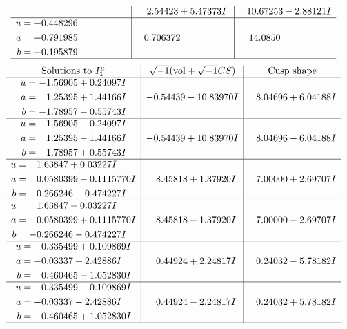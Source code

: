 \documentclass[1p]{elsarticle_modified}
\theoremstyle{definition}
\newcommand{\I}{\sqrt{-1}}
\begin{document}
$$\begin{array}{c|c|c}
 & \phantom{-}2.54423 + 5.47373 I & \phantom{-}10.67253 - 2.88121 I \\ \hline\begin{aligned}
u &= -0.448296\phantom{ +0.000000I} \\
a &= -0.791985\phantom{ +0.000000I} \\
b &= -0.195879\phantom{ +0.000000I}\end{aligned}
 & \phantom{-}0.706372\phantom{ +0.000000I} & \phantom{-}14.0850\phantom{ +0.000000I}\\
 \hline 
 \end{array}$$\newpage$$\begin{array}{c|c|c}  
\text{Solutions to }I^u_{1}& \I (\text{vol} + \sqrt{-1}CS) & \text{Cusp shape}\\
 \hline 
\begin{aligned}
u &= -1.56905 + 0.24097 I \\
a &= \phantom{-}1.25395 + 1.44166 I \\
b &= -1.78957 - 0.55743 I\end{aligned}
 & -0.54439 - 10.83970 I & \phantom{-}8.04696 + 6.04188 I \\ \hline\begin{aligned}
u &= -1.56905 - 0.24097 I \\
a &= \phantom{-}1.25395 - 1.44166 I \\
b &= -1.78957 + 0.55743 I\end{aligned}
 & -0.54439 + 10.83970 I & \phantom{-}8.04696 - 6.04188 I \\ \hline\begin{aligned}
u &= \phantom{-}1.63847 + 0.03227 I \\
a &= \phantom{-}0.0580399 - 0.1115770 I \\
b &= -0.266246 + 0.474227 I\end{aligned}
 & \phantom{-}8.45818 + 1.37920 I & \phantom{-}7.00000 + 2.69707 I \\ \hline\begin{aligned}
u &= \phantom{-}1.63847 - 0.03227 I \\
a &= \phantom{-}0.0580399 + 0.1115770 I \\
b &= -0.266246 - 0.474227 I\end{aligned}
 & \phantom{-}8.45818 - 1.37920 I & \phantom{-}7.00000 - 2.69707 I \\ \hline\begin{aligned}
u &= \phantom{-}0.335499 + 0.109869 I \\
a &= -0.03337 + 2.42886 I \\
b &= \phantom{-}0.460465 - 1.052830 I\end{aligned}
 & \phantom{-}0.44924 + 2.24817 I & \phantom{-}0.24032 - 5.78182 I \\ \hline\begin{aligned}
u &= \phantom{-}0.335499 - 0.109869 I \\
a &= -0.03337 - 2.42886 I \\
b &= \phantom{-}0.460465 + 1.052830 I\end{aligned}
 & \phantom{-}0.44924 - 2.24817 I & \phantom{-}0.24032 + 5.78182 I\\
 \hline 
 \end{array}$$\newpage\newpage\renewcommand{\arraystretch}{1}
\end{document}
